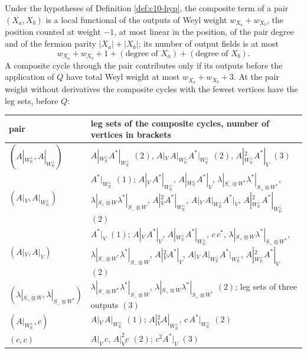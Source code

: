 \begin{proposition}
\label{prop:c10-compbound}
Under the hypotheses of Definition \ref{def:c10-hyp}, the composite term of a pair $(X_a,X_b)$ is a local functional of the outputs of Weyl weight $w_{X_a}+w_{X_b}$, the position counted at weight $-1$, at most linear in the position, of the pair degree and of the fermion parity $|X_a|+|X_b|$; its number of output fields is at most
\[
w_{X_a}+w_{X_b}+1+(\text{degree of }X_a)+(\text{degree of }X_b).
\]
A composite cycle through the pair contributes only if its outputs before the application of $Q$ have total Weyl weight at most $w_{X_a}+w_{X_b}+3$. At the pair weight without derivatives the composite cycles with the fewest vertices have the leg sets, before $Q$:

\begin{tabular}{l|l}
pair & leg sets of the composite cycles, number of vertices in brackets\\
\hline
$(A|_{W_{\mathbb R}^\perp},A|_{W_{\mathbb R}^\perp})$ & $A|_{W_{\mathbb R}^\perp}A^*|_{W_{\mathbb R}^\perp}$ $(2)$, $A|_V\,A|_{W_{\mathbb R}^\perp}A^*|_{W_{\mathbb R}^\perp}$ $(2)$, $A|_{W_{\mathbb R}^\perp}^2A^*|_V$ $(3)$\\
$(A|_V,A|_{W_{\mathbb R}^\perp})$ & $A^*|_{W_{\mathbb R}^\perp}$ $(1)$; $A|_V\,A^*|_{W_{\mathbb R}^\perp}$, $A|_{W_{\mathbb R}^\perp}A^*|_V$, $\lambda|_{S_-\otimes W^*}\lambda^*|_{S_+\otimes W^*}$, $\lambda|_{S_+\otimes W}\lambda^*|_{S_-\otimes W}$, $A|_V^2A^*|_{W_{\mathbb R}^\perp}$, $A|_V\,A|_{W_{\mathbb R}^\perp}A^*|_V$, $A|_{W_{\mathbb R}^\perp}^2A^*|_{W_{\mathbb R}^\perp}$ $(2)$\\
$(A|_V,A|_V)$ & $A^*|_V$ $(1)$; $A|_V\,A^*|_V$, $A|_{W_{\mathbb R}^\perp}A^*|_{W_{\mathbb R}^\perp}$, $c\,c^*$, $\lambda|_{S_+\otimes W}\lambda^*|_{S_+\otimes W^*}$, $\lambda|_{S_-\otimes W^*}\lambda^*|_{S_-\otimes W}$, $A|_V^2A^*|_V$, $A|_V\,A|_{W_{\mathbb R}^\perp}A^*|_{W_{\mathbb R}^\perp}$, $A|_{W_{\mathbb R}^\perp}^2A^*|_V$ $(2)$\\
$(\lambda|_{S_+\otimes W},\lambda|_{S_-\otimes W^*})$ & $\lambda|_{S_-\otimes W^*}\lambda^*|_{S_-\otimes W}$, $\lambda|_{S_+\otimes W}\lambda^*|_{S_+\otimes W^*}$ $(2)$; leg sets of three outputs $(3)$\\
$(A|_{W_{\mathbb R}^\perp},c)$ & $A|_V\,A|_{W_{\mathbb R}^\perp}$ $(1)$; $A|_V^2A|_{W_{\mathbb R}^\perp}$, $c\,A^*|_{W_{\mathbb R}^\perp}$ $(2)$\\
$(c,c)$ & $A|_V\,c$, $A|_V^2c$ $(2)$; $c^2A^*|_V$ $(3)$\\
\end{tabular}
\end{proposition}

